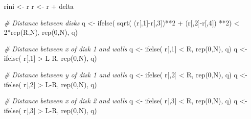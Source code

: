 \documentclass[11pt]{article}
\newenvironment{Shaded}{}{}
\newcommand{\DecValTok}[1]{\textcolor[rgb]{0.25,0.63,0.44}{{#1}}}
\newcommand{\CommentTok}[1]{\textcolor[rgb]{0.38,0.63,0.69}{\textit{{#1}}}}
\newcommand{\OtherTok}[1]{\textcolor[rgb]{0.00,0.44,0.13}{{#1}}}
\newcommand{\FunctionTok}[1]{\textcolor[rgb]{0.02,0.16,0.49}{{#1}}}
\newcommand{\NormalTok}[1]{{#1}}
\newcommand{\SpecialCharTok}[1]{\textcolor[rgb]{0.25,0.44,0.63}{{#1}}}
\begin{document}
\begin{Shaded}
\begin{Highlighting}[]
\NormalTok{        rini }\OtherTok{\textless{}{-}}\NormalTok{ r}
\NormalTok{        r }\OtherTok{\textless{}{-}}\NormalTok{ r }\SpecialCharTok{+}\NormalTok{ delta}
        
        \CommentTok{\# Distance between disks}
\NormalTok{        q }\OtherTok{\textless{}{-}} \FunctionTok{ifelse}\NormalTok{( }\FunctionTok{sqrt}\NormalTok{( (r[,}\DecValTok{1}\NormalTok{]}\SpecialCharTok{{-}}\NormalTok{r[,}\DecValTok{3}\NormalTok{])}\SpecialCharTok{**}\DecValTok{2} \SpecialCharTok{+}\NormalTok{ (r[,}\DecValTok{2}\NormalTok{]}\SpecialCharTok{{-}}\NormalTok{r[,}\DecValTok{4}\NormalTok{]) }\SpecialCharTok{**}\DecValTok{2}\NormalTok{) }\SpecialCharTok{\textless{}} \DecValTok{2}\SpecialCharTok{*}\FunctionTok{rep}\NormalTok{(R,N), }\FunctionTok{rep}\NormalTok{(}\DecValTok{0}\NormalTok{,N), q)}
        
        \CommentTok{\# Distance between x of disk 1 and walls}
\NormalTok{        q }\OtherTok{\textless{}{-}} \FunctionTok{ifelse}\NormalTok{( r[,}\DecValTok{1}\NormalTok{] }\SpecialCharTok{\textless{}}\NormalTok{ R, }\FunctionTok{rep}\NormalTok{(}\DecValTok{0}\NormalTok{,N), q)}
\NormalTok{        q }\OtherTok{\textless{}{-}} \FunctionTok{ifelse}\NormalTok{( r[,}\DecValTok{1}\NormalTok{] }\SpecialCharTok{\textgreater{}}\NormalTok{ L}\SpecialCharTok{{-}}\NormalTok{R, }\FunctionTok{rep}\NormalTok{(}\DecValTok{0}\NormalTok{,N), q)}
        
        \CommentTok{\# Distance between y of disk 1 and walls}
\NormalTok{        q }\OtherTok{\textless{}{-}} \FunctionTok{ifelse}\NormalTok{( r[,}\DecValTok{2}\NormalTok{] }\SpecialCharTok{\textless{}}\NormalTok{ R, }\FunctionTok{rep}\NormalTok{(}\DecValTok{0}\NormalTok{,N), q)}
\NormalTok{        q }\OtherTok{\textless{}{-}} \FunctionTok{ifelse}\NormalTok{( r[,}\DecValTok{2}\NormalTok{] }\SpecialCharTok{\textgreater{}}\NormalTok{ L}\SpecialCharTok{{-}}\NormalTok{R, }\FunctionTok{rep}\NormalTok{(}\DecValTok{0}\NormalTok{,N), q)}
        
        \CommentTok{\# Distance between x of disk 2 and walls}
\NormalTok{        q }\OtherTok{\textless{}{-}} \FunctionTok{ifelse}\NormalTok{( r[,}\DecValTok{3}\NormalTok{] }\SpecialCharTok{\textless{}}\NormalTok{ R, }\FunctionTok{rep}\NormalTok{(}\DecValTok{0}\NormalTok{,N), q)}
\NormalTok{        q }\OtherTok{\textless{}{-}} \FunctionTok{ifelse}\NormalTok{( r[,}\DecValTok{3}\NormalTok{] }\SpecialCharTok{\textgreater{}}\NormalTok{ L}\SpecialCharTok{{-}}\NormalTok{R, }\FunctionTok{rep}\NormalTok{(}\DecValTok{0}\NormalTok{,N), q)}
        

\end{Highlighting}
\end{Shaded}
\end{document}
